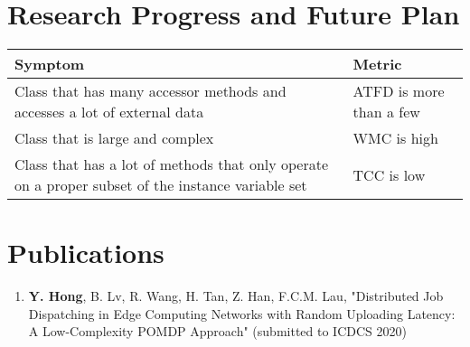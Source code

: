 \section{Research Progress and Future Plan}

\begin{tabularx}{\textwidth}{X|l}
    \textbf{Symptom} & \textbf{Metric} \\
  \hline
  Class that has many accessor methods and accesses a lot of external data & ATFD is more than a few\\
  Class that is large and complex & WMC is high\\
  Class that has a lot of methods that only operate on a proper subset of the instance variable set & TCC is low\\
  \end{tabularx}

\section{Publications}
\begin{enumerate}
    \item \textbf{Y. Hong}, {B. Lv}, {R. Wang}, {H. Tan}, {Z. Han}, {F.C.M. Lau}, "Distributed Job Dispatching in Edge Computing Networks with Random Uploading Latency: A Low-Complexity POMDP Approach" (submitted to ICDCS 2020)
\end{enumerate}